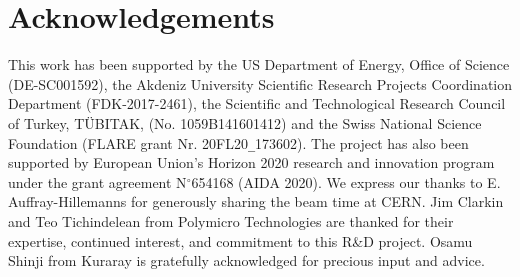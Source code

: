\documentclass[a4paper,11pt]{article}
\begin{document}

\section{Acknowledgements}
This work has been supported by the US Department of Energy, Office of Science (DE-SC001592), the Akdeniz University Scientific Research Projects Coordination Department (FDK-2017-2461), the Scientific and Technological Research Council of Turkey, T\"UBITAK, (No. 1059B141601412) and the Swiss National Science Foundation (FLARE grant Nr. 20FL20\texttt{\_}173602). The project has also been supported by European Union's Horizon 2020 research and innovation program under the grant agreement N$^\circ$654168 (AIDA 2020). We express our thanks to E. Auffray-Hillemanns for generously sharing the beam time at CERN. Jim Clarkin and Teo Tichindelean from Polymicro Technologies are thanked for their expertise, continued interest, and commitment to this R\&D project. Osamu Shinji from Kuraray is gratefully acknowledged for precious input and advice.




\end{document}
